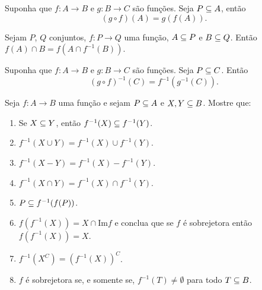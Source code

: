 \documentclass[12pt]{exam}
\begin{document}
    \questao{} Suponha que $f : A \to B$ e $g : B \to C$ são funções. Seja $P \subseteq A$, então
    \[
        (g \circ f)(A) = g(f(A)).
    \]

    \vspace{.3cm}

    \questao{} Sejam $P$, $Q$ conjuntos, $f : P \to Q$ uma função, $A \subseteq P$ e $B \subseteq Q$. Então $f(A) \cap B = f(A \cap f^{-1}(B))$.

    \vspace{.3cm}

    \questao{} Suponha que $f : A \to B$ e $g : B \to C$ são funções. Seja $P \subseteq C$. Então
    \[
        (g \circ f)^{-1}(C) = f^{-1}(g^{-1}(C)).
    \]

    \newpage

    \questao{} Seja $f : A \to B$ uma fun{\c c}{\~a}o e sejam $P \subseteq
    A$ e $X, Y\subseteq B$. Mostre que:
    \begin{enumerate}[label={\alph*})]
        \item Se $X\subseteq Y$, ent{\~a}o $f^{-1}(X)\subseteq f^{-1}(Y)$.

        \item $f^{-1}(X\cup Y)=f^{-1}(X)\cup f^{-1}(Y)$.

        \item $f^{-1}(X - Y) = f^{-1}(X) - f^{-1}(Y)$.

        \item $f^{-1}(X\cap Y)= f^{-1}(X)\cap f^{-1}(Y)$.

        \item $P\subseteq f^{-1}(f(P))$.

        \item $f(f^{-1}(X))= X \cap \mbox{Im}f$ e conclua que se $f$ {\'e} sobrejetora ent{\~a}o
        $f(f^{-1}(X))=X$.
        \item $f^{-1}(X^C) = (f^{-1}(X))^C$.

        \item $f$ \'e sobrejetora se, e somente se, $f^{-1}(T) \ne \emptyset$ para todo $T \subseteq B$.
    \end{enumerate}
\end{document}
